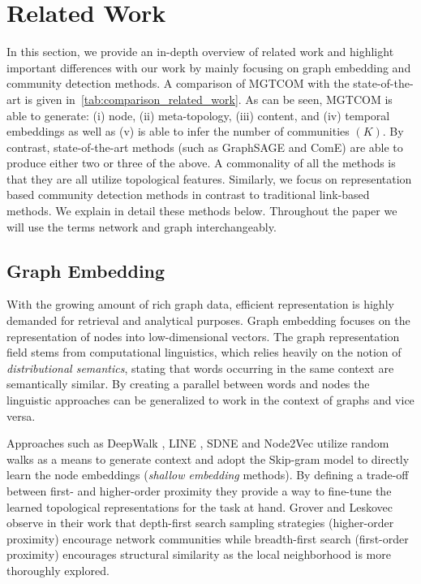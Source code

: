 \chapter{Related Work} \label{sec:related_work}

In this section, we provide an in-depth overview of related work and highlight important differences with our work by  mainly focusing on  graph embedding and community detection methods. A comparison of MGTCOM with the state-of-the-art is given in~\cref{tab:comparison_related_work}. 
As can be seen, MGTCOM is able to generate: (i) node, (ii) meta-topology, (iii) content, and (iv) temporal embeddings as well as (v) is able to infer the number of communities $(K)$. By contrast, state-of-the-art methods (such as GraphSAGE and ComE) are able to produce either two or three of the above. 
A commonality of all the methods is that they are all utilize topological features. 
Similarly, we focus on representation based community detection methods in contrast to traditional link-based methods.
We explain in detail these methods below. 
Throughout the paper we will use the terms network and graph interchangeably.



\section{Graph Embedding}
With the growing amount of rich graph data, efficient representation is highly demanded for retrieval and analytical purposes. 
Graph embedding focuses on the representation of nodes into low-dimensional vectors.
%
The graph representation field stems from computational linguistics, which relies heavily on the notion of \textit{distributional semantics}, stating that words occurring in the same context are semantically similar. By creating a parallel between words and nodes the linguistic approaches can be generalized to work in the context of graphs and vice versa.

Approaches such as DeepWalk \cite{perozziDeepWalkOnlineLearning2014}, LINE \cite{tangLINELargescaleInformation2015}, SDNE \cite{wangStructuralDeepNetwork2016} and Node2Vec \cite{groverNode2vecScalableFeature2016} utilize random walks as a means to generate context and adopt the Skip-gram \cite{mikolovDistributedRepresentationsWords2013} model to directly learn the node embeddings (\textit{shallow embedding} methods). 
By defining a trade-off between first- and higher-order proximity they provide a way to fine-tune the learned topological representations for the task at hand. 
Grover and Leskovec \cite{groverNode2vecScalableFeature2016} observe in their work that depth-first search sampling strategies (higher-order proximity) encourage network communities while breadth-first search (first-order proximity) encourages structural similarity as the local neighborhood is more thoroughly explored. 

